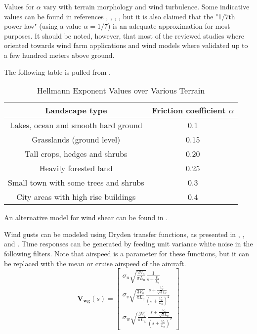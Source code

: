 Values for $\alpha$ vary with terrain morphology and wind turbulence. Some indicative values can be found in references \cite{Banuelos-Ruedas2011}, \cite{Peterson1978}, \cite{wiki:WindGrad}, \cite{wiki:Wind_profile_power_law}, but it is also claimed that the "1/7th power law" (using a value $\alpha=1/7$) is an adequate approximation for most purposes.
It should be noted, however, that most of the reviewed studies where oriented towards wind farm applications and wind models where validated up to a few hundred meters above ground.

The following table is pulled from \cite{Banuelos-Ruedas2011}.

\begin{table}[H]
	\centering
	\begin{tabular}{|c|c|}
		\hline
		Landscape type             & Friction coefficient $\alpha$ \\ \hline
		Lakes, ocean and smooth hard ground  &              0.1              \\ \hline
		Grasslands (ground level)       &             0.15              \\ \hline
		Tall crops, hedges and shrubs     &             0.20              \\ \hline
		Heavily forested land         &             0.25              \\ \hline
		Small town with some trees and shrubs &              0.3              \\ \hline
		City areas with high rise buildings  &              0.4              \\ \hline
	\end{tabular} 
	\caption{Hellmann Exponent Values over Various Terrain}
\end{table}

An alternative model for wind shear can be found in \cite{Moorhouse1982}.

Wind gusts can be modeled using Dryden transfer functions, as presented in \cite{Moorhouse1982}, \cite{BEAL1993}, \cite{MathWorks:DrydenTurbulence} and \cite{Beard2012} . Time responses can be generated by feeding unit variance white noise in the following filters. Note that airspeed is a parameter for these functions, but it can be replaced with the mean or cruise airspeed of the aircraft.
\begin{equation}
\bm{V_{wg}}(s) =
\begin{bmatrix}
\sigma_u \sqrt{\frac{2V_a}{\pi L_u}} \frac{1}{s + \frac{V_a}{L_u}}\\
\sigma_v \sqrt{\frac{3V_a}{\pi L_v}} \frac{s+\frac{V_a}{\sqrt{3}L_v}}{(s+\frac{V_a}{L_u})^2} \\
\sigma_w \sqrt{\frac{3V_a}{\pi L_w}} \frac{s+\frac{V_a}{\sqrt{3}L_w}}{(s+\frac{V_a}{L_w})^2}
\end{bmatrix}
\end{equation}

